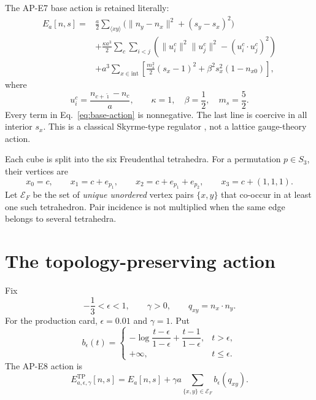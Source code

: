 \documentclass[11pt]{article}
\numberwithin{equation}{section}
\theoremstyle{definition}
\theoremstyle{remark}
\newcommand{\cE}{\mathcal E}
\begin{document}
The AP-E7 base action is retained literally:
\begin{align}
 E_a[n,s]={}&\frac a2\sum_{\langle xy\rangle}
 \bigl(\lVert n_y-n_x\rVert^2+(s_y-s_x)^2\bigr)\nonumber\\
 &+\frac{\kappa a^3}{2}\sum_c\sum_{i<j}
 \left(\lVert u_i^c\rVert^2\lVert u_j^c\rVert^2
 -(u_i^c\!\cdot u_j^c)^2\right)\nonumber\\
 &+a^3\sum_{x\in\mathrm{int}}
 \left[\frac{m_s^2}{2}(s_x-1)^2
 +\beta^2s_x^2(1-n_{x0})\right],
 \label{eq:base-action}
\end{align}
where
\begin{equation}
 u_i^c=\frac{n_{c+\hat\imath}-n_c}{a},\qquad
 \kappa=1,\quad\beta=\frac12,\quad m_s=\frac52.
 \label{eq:base-parameters}
\end{equation}
Every term in Eq.~\eqref{eq:base-action} is nonnegative.  The last line is
coercive in all interior \(s_x\).  This is a classical Skyrme-type regulator
\cite{Skyrme1961APE8}, not a lattice gauge-theory action.

Each cube is split into the six Freudenthal tetrahedra.  For a permutation
\(p\in S_3\), their vertices are
\begin{equation}
 x_0=c,\qquad x_1=c+e_{p_1},\qquad
 x_2=c+e_{p_1}+e_{p_2},\qquad x_3=c+(1,1,1).
 \label{eq:freudenthal}
\end{equation}
Let \(\cE_F\) be the set of \emph{unique unordered} vertex pairs
\(\{x,y\}\) that co-occur in at least one such tetrahedron.  Pair incidence
is not multiplied when the same edge belongs to several tetrahedra.

\section{The topology-preserving action}

Fix
\begin{equation}
 -\frac13<\epsilon<1,\qquad \gamma>0,\qquad
 q_{xy}=n_x\cdot n_y.
\end{equation}
For the production card, \(\epsilon=0.01\) and \(\gamma=1\).  Put
\begin{equation}
 b_\epsilon(t)=
 \begin{cases}
 -\log\!\dfrac{t-\epsilon}{1-\epsilon}
 +\dfrac{t-1}{1-\epsilon},&t>\epsilon,\\[6pt]
 +\infty,&t\le\epsilon.
 \end{cases}
 \label{eq:barrier}
\end{equation}
The AP-E8 action is
\begin{equation}
 \boxed{
 E^{\mathrm{TP}}_{a,\epsilon,\gamma}[n,s]
 =E_a[n,s]+\gamma a\sum_{\{x,y\}\in\cE_F}
 b_\epsilon(q_{xy}).}
 \label{eq:tp-action}
\end{equation}
\end{document}
